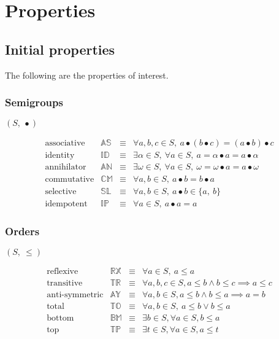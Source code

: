 \documentclass[10pt]{article}
\newcommand{\propname}[1]{{\mathbb{#1}}}
\begin{document}
\section{Properties} 

\subsection{Initial properties}

The following are the properties of interest.
\subsubsection{Semigroups}
$(S,\ \bullet)$

\[ 
\begin{array}{c|ccl} 
\mbox{associative} 
   & \propname{AS} 
   & \equiv 
   & \forall a, b, c \in S,\ a \bullet (b \bullet c) = (a \bullet b) \bullet c 
   \\ 
\mbox{identity}    
   & \propname{ID} 
   & \equiv 
   & \exists \alpha\in S,\ \forall a\in S,\ a = \alpha \bullet a = a \bullet \alpha
   \\ 
\mbox{annihilator} 
   & \propname{AN} 
   & \equiv 
   & \exists \omega\in S,\ \forall a\in S,\ \omega = \omega \bullet a = a \bullet \omega
   \\ 
\mbox{commutative} 
   & \propname{CM} 
   & \equiv 
   & \forall a, b \in S,\ a\bullet b =  b\bullet a
   \\
\mbox{selective}   
   & \propname{SL} 
   & \equiv 
   & \forall a, b \in S,\ a\bullet b  \in  \{a,\ b\} 
   \\ 
\mbox{idempotent}  
   & \propname{IP} 
   & \equiv 
   & \forall a \in S,\ a\bullet a  =  a
\end{array} 
\] 

\subsubsection{Orders}

$(S,\ \leq)$

\[ 
\begin{array}{c|ccl} 
\mbox{reflexive} 
   & \propname{RX} 
   & \equiv 
   & \forall a \in S,\ a \leq a 
   \\ 
\mbox{transitive}    
   & \propname{TR} 
   & \equiv 
   & \forall a, b, c \in S, a\leq b \wedge b \leq c \implies a \leq c 
   \\ 
\mbox{anti-symmetric} 
   & \propname{AY} 
   & \equiv 
   & \forall a, b\in S, a\leq b \wedge b \leq a \implies a = b
   \\ 
\mbox{total} 
   & \propname{TO} 
   & \equiv 
   & \forall a, b \in S,\ a\leq b \vee  b\leq a
   \\
\mbox{bottom}   
   & \propname{BM} 
   & \equiv 
   & \exists b \in S, \forall a \in S, b\leq a
   \\ 
\mbox{top}   
   & \propname{TP} 
   & \equiv 
   & \exists t \in S, \forall a \in S, a\leq t
\end{array} 
\] 
\end{document}
